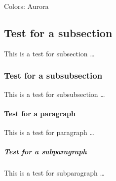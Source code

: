 \noindent
Colors: Aurora \\

\newpage
\subsection{Test for a subsection} 
This is a test for subsection \ldots

\subsubsection{Test for a subsubsection}
This is a test for subsubsection \ldots 

\paragraph{Test for a paragraph} 
This is a test for paragraph \ldots

\subparagraph{Test for a subparagraph} 
This is a test for subparagraph \ldots 
